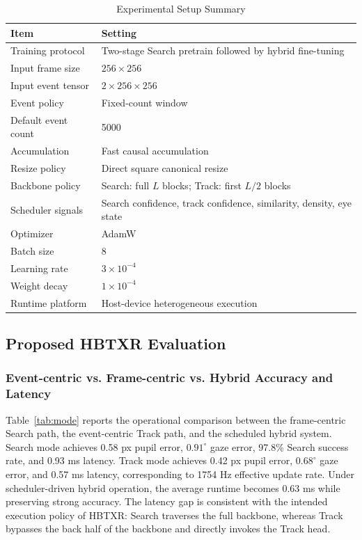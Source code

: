 \documentclass[journal]{IEEEtran}
\begin{document}
\begin{table}[t]
\caption{Experimental Setup Summary}
\label{tab:setup}
\centering
\footnotesize
\begin{tabularx}{\columnwidth}{@{}L{0.36\columnwidth}Y@{}}
\toprule
Item & Setting \\
\midrule
Training protocol & Two-stage Search pretrain followed by hybrid fine-tuning \\
Input frame size & $256\times256$ \\
Input event tensor & $2\times256\times256$ \\
Event policy & Fixed-count window \\
Default event count & 5000 \\
Accumulation & Fast causal accumulation \\
Resize policy & Direct square canonical resize \\
Backbone policy & Search: full $L$ blocks; Track: first $L/2$ blocks \\
Scheduler signals & Search confidence, track confidence, similarity, density, eye state \\
Optimizer & AdamW \\
Batch size & 8 \\
Learning rate & $3\times10^{-4}$ \\
Weight decay & $1\times10^{-4}$ \\
Runtime platform & Host-device heterogeneous execution \\
\bottomrule
\end{tabularx}
\end{table}

\subsection{Proposed HBTXR Evaluation}
\subsubsection{Event-centric vs. Frame-centric vs. Hybrid Accuracy and Latency}
Table~\ref{tab:mode} reports the operational comparison between the frame-centric Search path, the event-centric Track path, and the scheduled hybrid system. Search mode achieves 0.58 px pupil error, $0.91^{\circ}$ gaze error, 97.8\% Search success rate, and 0.93 ms latency. Track mode achieves 0.42 px pupil error, $0.68^{\circ}$ gaze error, and 0.57 ms latency, corresponding to 1754 Hz effective update rate. Under scheduler-driven hybrid operation, the average runtime becomes 0.63 ms while preserving strong accuracy. The latency gap is consistent with the intended execution policy of HBTXR: Search traverses the full backbone, whereas Track bypasses the back half of the backbone and directly invokes the Track head.
\end{document}
